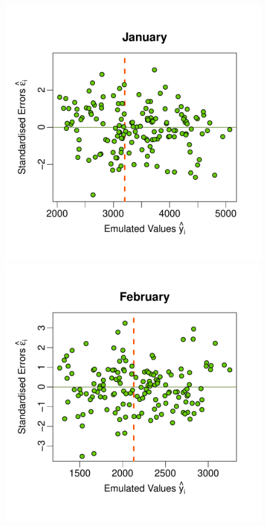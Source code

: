\documentclass[a4paper, 12pt]{article}
\begin{document}
\begin{figure}
\centering
 \includegraphics[width=\scale]{Validation_Plots/Test_Set/Test_Scatter_01_Jan}\hspace{-1ex}
 \includegraphics[width=\scale]{Validation_Plots/Test_Set/Test_Scatter_02_Feb}\hspace{-1ex}

\end{figure}
\end{document}
